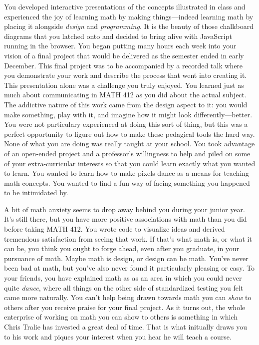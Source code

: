 \documentclass[../main.tex]{subfiles}
\begin{document}
You developed interactive presentations of the concepts illustrated in class and experienced the joy of learning math by making things---indeed learning math by placing it alongside \textit{design} and \textit{programming}. It is the beauty of those chalkboard diagrams that you latched onto and decided to bring alive with JavaScript running in the browser. You began putting many hours each week into your vision of a final project that would be delivered as the semester ended in early December. This final project was to be accompanied by a recorded talk where you demonstrate your work and describe the process that went into creating it. This presentation alone was a challenge you truly enjoyed. You learned just as much about communicating in MATH 412 as you did about the actual subject. The addictive nature of this work came from the design aspect to it: you would make something, play with it, and imagine how it might look differently---better. You were not particulary experienced at doing this sort of thing, but this was a perfect opportunity to figure out how to make these pedagical tools the hard way. None of what you are doing was really taught at your school. You took advantage of an open-ended project and a professor's willingness to help and piled on some of your extra-curricular interests so that you could learn exactly what you wanted to learn. You wanted to learn how to make pixels dance as a means for teaching math concepts. You wanted to find a fun way of facing something you happened to be intimidated by.

A bit of math anxiety seems to drop away behind you during your junior year. It's still there, but you have more positive associations with math than you did before taking MATH 412. You wrote code to visualize ideas and derived tremendous satisfaction from seeing that work. If that's what math is, or what it can be, you think you ought to forge ahead, even after you graduate, in your pursuance of math. Maybe math is design, or design can be math. You've never been bad at math, but you've also never found it particularly pleasing or easy. To your friends, you have explained math as as an area in which you could never quite \textit{dance}, where all things on the other side of standardized testing you felt came more naturally. You can't help being drawn towards math you can \textit{show} to others after you receive praise for your final project. As it turns out, the whole enterprise of working on math you can show to others is something in which Chris Tralie has invested a great deal of time. That is what initually draws you to his work and piques your interest when you hear he will teach a course.
\end{document}
